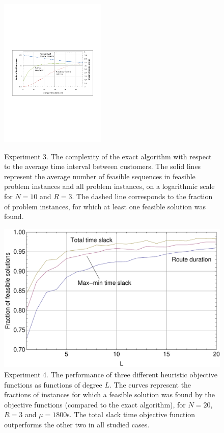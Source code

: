 \documentclass[dissertation,draft*]{aaltoseries}
\begin{document}
\begin{figure}
\centering
\parbox{0.45\textwidth}{
\includegraphics[width=0.45\textwidth]{intvertailu01.pdf}
\caption{\tiny Experiment 3. The complexity of the exact algorithm with respect to the average time 
interval between customers. The solid lines represent the average number of feasible sequences in
feasible problem instances and all problem instances, on a logarithmic scale for $N=10$ and $R=3$.
The dashed line corresponds to the fraction
of problem instances, for which at least one feasible solution was found.}
\label{intvertailu01}
}
\qquad
\begin{minipage}{0.45\textwidth}
\includegraphics[width=1.0\textwidth]{objvertailu01.pdf}
\caption{\tiny Experiment 4. The performance of three different heuristic objective functions as functions of degree $L$.
The curves represent the fractions of instances for which a feasible solution was found by the objective functions 
(compared to the exact algorithm), 
for $N=20$, $R=3$ and $\mu=1800$s. The total slack time objective function
outperforms the other two in all studied cases.
}
\label{objvertailu01}
\end{minipage}
\end{figure}
\end{document}
